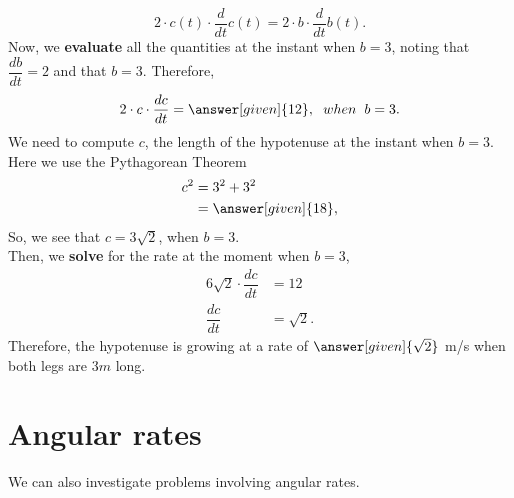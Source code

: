 \documentclass{ximera}
\begin{document}
\begin{example}
\begin{explanation}
			\[
			2\cdot c(t)\cdot\dfrac{d}{dt}c(t) = 2\cdot b\cdot\dfrac{d}{dt}b(t).
			\]
			Now, we \textbf{evaluate} all the quantities at the instant when $b=3$, noting that
			$\dfrac{db}{dt} = 2$ and that $b = 3$. Therefore,
			\[
			2\cdot c\cdot\dfrac{dc}{dt}= \answer[given]{12},\hspace{0.08in} when\hspace{0.08in}b=3.
			\]
			We need to compute $c$, the length of the hypotenuse at the instant when $b=3$. Here we use
			the Pythagorean Theorem
			\begin{align*}
				c^2 &= 3^2 + 3^2\\
				&=\answer[given]{18},
			\end{align*}
			So, we see that $c = 3\sqrt{2}$, when $b=3$. \\
			Then, we \textbf{solve} for the rate at the moment when $b=3$,\\
			\begin{align*}
				6\sqrt{2}\cdot \dfrac{dc}{dt} &= 12 \\     
				\dfrac{dc}{dt} &= \sqrt{2}.
			\end{align*}
			Therefore, the hypotenuse  is growing at a rate of $\answer[given]{\sqrt{2}}$ m/s when both legs are $3m$ long.
		\end{explanation}
	\end{example}
	
	
	\section{Angular rates}
	
	
	We can also investigate problems involving angular rates.
	
\end{document}

